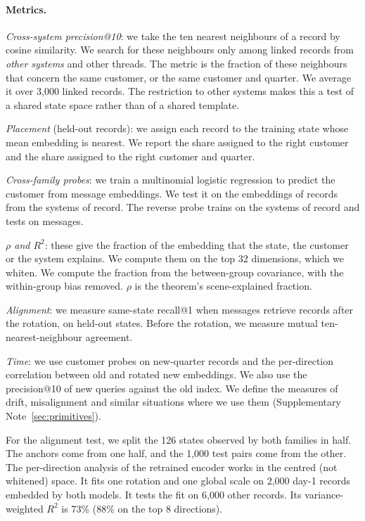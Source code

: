 \documentclass[11pt]{article}
\begin{document}
\paragraph{Metrics.}
\emph{Cross-system precision@10}: we take the ten nearest neighbours of a record by cosine similarity. We search for these neighbours only among linked records from \emph{other systems} and other threads. The metric is the fraction of these neighbours that concern the same customer, or the same customer and quarter. We average it over 3{,}000 linked records. The restriction to other systems makes this a test of a shared state space rather than of a shared template.

\emph{Placement} (held-out records): we assign each record to the training state whose mean embedding is nearest. We report the share assigned to the right customer and the share assigned to the right customer and quarter.

\emph{Cross-family probes}: we train a multinomial logistic regression to predict the customer from message embeddings. We test it on the embeddings of records from the systems of record. The reverse probe trains on the systems of record and tests on messages.

\emph{$\rho$ and $R^2$}: these give the fraction of the embedding that the state, the customer or the system explains. We compute them on the top 32 dimensions, which we whiten. We compute the fraction from the between-group covariance, with the within-group bias removed. $\rho$ is the theorem's scene-explained fraction.

\emph{Alignment}: we measure same-state recall@1 when messages retrieve records after the rotation, on held-out states. Before the rotation, we measure mutual ten-nearest-neighbour agreement.

\emph{Time}: we use customer probes on new-quarter records and the per-direction correlation between old and rotated new embeddings. We also use the precision@10 of new queries against the old index. We define the measures of drift, misalignment and similar situations where we use them (Supplementary Note~\ref{sec:primitives}).

For the alignment test, we split the 126 states observed by both families in half. The anchors come from one half, and the 1{,}000 test pairs come from the other. The per-direction analysis of the retrained encoder works in the centred (not whitened) space. It fits one rotation and one global scale on 2{,}000 day-1 records embedded by both models. It tests the fit on 6{,}000 other records. Its variance-weighted $R^2$ is 73\% (88\% on the top 8 directions).
\end{document}
